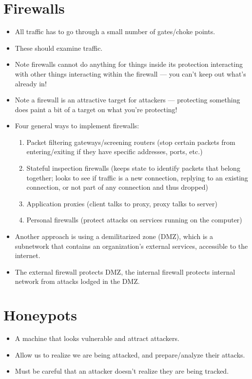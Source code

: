 \documentclass{article}
\begin{document}
\section{Firewalls}
\begin{itemize}
    \item All traffic has to go through a small number of gates/choke points.
    \item These should examine traffic.
    \item Note firewalls cannot do anything for things inside its protection interacting with other things interacting within the firewall --- you can't keep out what's already in!
    \item Note a firewall is an attractive target for attackers --- protecting something does paint a bit of a target on what you're protecting!
    \item Four general ways to implement firewalls:
        \begin{enumerate}
            \item Packet filtering gateways/screening routers (stop certain packets from entering/exiting if they have specific addresses, ports, etc.)
            \item Stateful inspection firewalls (keeps state to identify packets that belong together; looks to see if traffic is a new connection, replying to an existing connection, or not part of any connection and thus dropped)
            \item Application proxies (client talks to proxy, proxy talks to server)
            \item Personal firewalls (protect attacks on services running on the computer)
        \end{enumerate}
    \item Another approach is using a demilitarized zone (DMZ), which is a subnetwork that contains an organization's external services, accessible to the internet.
    \item The external firewall protects DMZ, the internal firewall protects internal network from attacks lodged in the DMZ.
\end{itemize}

\section{Honeypots}
\begin{itemize}
    \item A machine that looks vulnerable and attract attackers.
    \item Allow us to realize we are being attacked, and prepare/analyze their attacks.
    \item Must be careful that an attacker doesn't realize they are being tracked.
\end{itemize}
\end{document}
